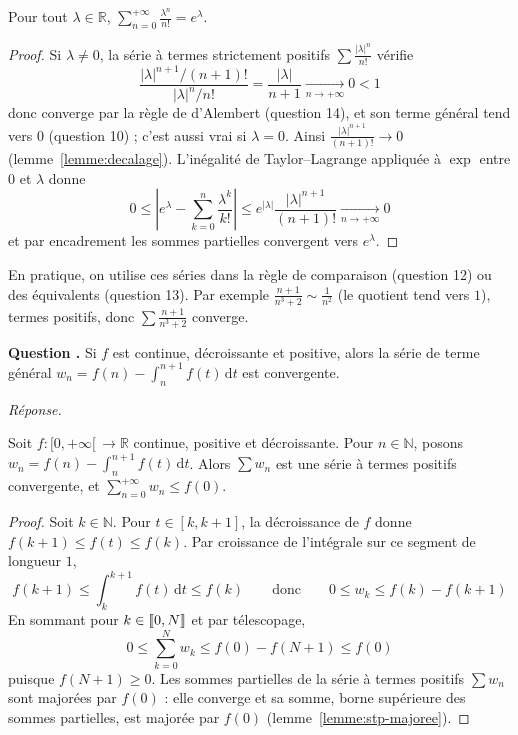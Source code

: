 \documentclass[11pt]{article}
\newcounter{qnum}
\newcommand{\question}[1]{%
\stepcounter{qnum}%
\bigskip
\noindent\textbf{Question \theqnum.} #1\par}
\newcommand{\reponse}{\noindent\textit{Réponse.}\ }
\begin{document}
\begin{prop}
\label{prop:serie-exponentielle}
Pour tout $\lambda\in\mathbb{R}$, $\displaystyle\sum_{n=0}^{+\infty}\frac{\lambda^n}{n!}=e^\lambda$.
\end{prop}

\begin{proof}
Si $\lambda\neq 0$, la série à termes strictement positifs $\sum\frac{|\lambda|^n}{n!}$ vérifie
\[\frac{|\lambda|^{n+1}/(n+1)!}{|\lambda|^n/n!}=\frac{|\lambda|}{n+1}\xrightarrow[n\to+\infty]{}0<1\]
donc converge par la règle de d'Alembert (question 14), et son terme général tend vers $0$ (question 10) ; c'est aussi vrai si $\lambda=0$. Ainsi $\frac{|\lambda|^{n+1}}{(n+1)!}\to 0$ (lemme~\ref{lemme:decalage}). L'inégalité de Taylor--Lagrange appliquée à $\exp$ entre $0$ et $\lambda$ donne
\[0\leq\left|e^\lambda-\sum_{k=0}^n\frac{\lambda^k}{k!}\right|\leq e^{|\lambda|}\frac{|\lambda|^{n+1}}{(n+1)!}\xrightarrow[n\to+\infty]{}0\]
et par encadrement les sommes partielles convergent vers $e^\lambda$.
\end{proof}

\begin{remarque}
En pratique, on utilise ces séries dans la règle de comparaison (question 12) ou des équivalents (question 13). Par exemple $\frac{n+1}{n^3+2}\sim\frac{1}{n^2}$ (le quotient tend vers $1$), termes positifs, donc $\sum\frac{n+1}{n^3+2}$ converge.
\end{remarque}

\question{Si $f$ est continue, décroissante et positive, alors la série de terme général $w_n=f(n)-\int_n^{n+1}f(t)\,\mathrm{d}t$ est convergente.}
\reponse

\begin{theo}
\label{theo:serie-integrale}
Soit $f:[0,+\infty[\,\to\mathbb{R}$ continue, positive et décroissante. Pour $n\in\mathbb{N}$, posons $w_n=f(n)-\int_n^{n+1}f(t)\,\mathrm{d}t$. Alors $\sum w_n$ est une série à termes positifs convergente, et $\sum_{n=0}^{+\infty}w_n\leq f(0)$.
\end{theo}

\begin{proof}
Soit $k\in\mathbb{N}$. Pour $t\in[k,k+1]$, la décroissance de $f$ donne $f(k+1)\leq f(t)\leq f(k)$. Par croissance de l'intégrale sur ce segment de longueur $1$,
\[f(k+1)\leq\int_k^{k+1}f(t)\,\mathrm{d}t\leq f(k)\qquad\text{donc}\qquad 0\leq w_k\leq f(k)-f(k+1)\]
En sommant pour $k\in\llbracket 0,N \rrbracket$ et par télescopage,
\[0\leq\sum_{k=0}^Nw_k\leq f(0)-f(N+1)\leq f(0)\]
puisque $f(N+1)\geq 0$. Les sommes partielles de la série à termes positifs $\sum w_n$ sont majorées par $f(0)$ : elle converge et sa somme, borne supérieure des sommes partielles, est majorée par $f(0)$ (lemme~\ref{lemme:stp-majoree}).
\end{proof}
\end{document}
